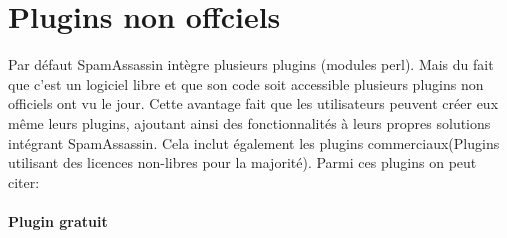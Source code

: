 \documentclass[a4paper,11pt]{article}
\begin{document}
\section{Plugins non offciels}

Par défaut SpamAssassin intègre plusieurs plugins (modules perl). Mais du fait que c'est un logiciel libre et que son code soit accessible plusieurs
plugins non officiels ont vu le jour. Cette avantage fait que les utilisateurs peuvent créer eux même leurs plugins,
ajoutant ainsi des fonctionnalités à leurs propres solutions intégrant SpamAssassin. Cela inclut également les plugins commerciaux(Plugins utilisant des licences non-libres pour la majorité). 
Parmi ces plugins on peut citer:

\paragraph{Plugin gratuit}
\end{document}
